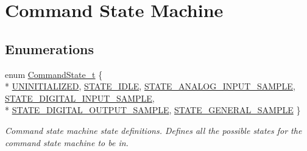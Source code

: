 \hypertarget{group__command__state}{\section{Command State Machine}
\label{group__command__state}
}
\subsection*{Enumerations}
\begin{DoxyCompactItemize}
\item 
enum \hyperlink{group__command__state_ga3a4df4a38f022d20e1627e722433ecc2}{Command\-State\-\_\-t} \{ \\*
\hyperlink{group__command__state_gga3a4df4a38f022d20e1627e722433ecc2af096820742c38363e9d6c33e7c932780}{U\-N\-I\-N\-I\-T\-I\-A\-L\-I\-Z\-E\-D}, 
\hyperlink{group__command__state_gga3a4df4a38f022d20e1627e722433ecc2aaade5e53e88cf231292cd1142cce2afe}{S\-T\-A\-T\-E\-\_\-\-I\-D\-L\-E}, 
\hyperlink{group__command__state_gga3a4df4a38f022d20e1627e722433ecc2a3b9c0d3ed012502e9177064ee2b10303}{S\-T\-A\-T\-E\-\_\-\-A\-N\-A\-L\-O\-G\-\_\-\-I\-N\-P\-U\-T\-\_\-\-S\-A\-M\-P\-L\-E}, 
\hyperlink{group__command__state_gga3a4df4a38f022d20e1627e722433ecc2a77acfb8a3554dce5cfe02ec58362f5e7}{S\-T\-A\-T\-E\-\_\-\-D\-I\-G\-I\-T\-A\-L\-\_\-\-I\-N\-P\-U\-T\-\_\-\-S\-A\-M\-P\-L\-E}, 
\\*
\hyperlink{group__command__state_gga3a4df4a38f022d20e1627e722433ecc2a428ac7286cbe23bb37c57c78fe7c967e}{S\-T\-A\-T\-E\-\_\-\-D\-I\-G\-I\-T\-A\-L\-\_\-\-O\-U\-T\-P\-U\-T\-\_\-\-S\-A\-M\-P\-L\-E}, 
\hyperlink{group__command__state_gga3a4df4a38f022d20e1627e722433ecc2aff11f1f959f0aabd852f15b8a63982b7}{S\-T\-A\-T\-E\-\_\-\-G\-E\-N\-E\-R\-A\-L\-\_\-\-S\-A\-M\-P\-L\-E}
 \}
\begin{DoxyCompactList}\small\item\em Command state machine state definitions. Defines all the possible states for the command state machine to be in. \end{DoxyCompactList}\end{DoxyCompactItemize}
